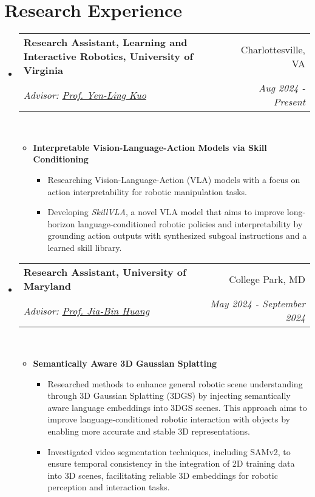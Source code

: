 \documentclass[letterpaper,11pt]{article}
\makeatletter
\newcommand{\Date}[1]{\textit{\small #1}}
\newcommand{\resumeSubheading}[4]{
  \item
    \begin{tabular*}{0.9798\textwidth}{l@{\extracolsep{\fill}}r} %
      \textbf{#1} & #2 \\
      \textit{\small#3} & \Date{#4} \\
    \end{tabular*}\
}
\makeatother
\begin{document}
\section{Research Experience}
\begin{itemize}
  \resumeSubheading{Research Assistant, Learning and Interactive Robotics, University of Virginia}{Charlottesville, VA}
  {Advisor: \href{https://yenlingkuo.com/}{Prof. Yen-Ling Kuo}}{Aug 2024 - Present}
  \begin{itemize}
    \item \textbf{Interpretable Vision-Language-Action Models via Skill Conditioning}
          \begin{itemize}
            \item Researching Vision-Language-Action (VLA) models with a focus on action interpretability for robotic manipulation tasks.
            \item Developing \textit{SkillVLA}, a novel VLA model that aims to improve long-horizon language-conditioned
                  robotic policies and interpretability by grounding action outputs with synthesized subgoal instructions and a learned skill library.
          \end{itemize}
  \end{itemize}

  \resumeSubheading{Research Assistant, University of Maryland}{College Park, MD}
  {Advisor: \href{https://jbhuang0604.github.io/}{Prof. Jia-Bin Huang}}{May 2024 - September 2024}
  \begin{itemize}
    \item \textbf{Semantically Aware 3D Gaussian Splatting}
          \begin{itemize}
            \item Researched methods to enhance general robotic scene understanding through 3D Gaussian Splatting (3DGS) by injecting semantically aware language embeddings into 3DGS scenes. This approach aims to improve language-conditioned robotic interaction with objects by enabling more accurate and stable 3D representations.
            \item Investigated video segmentation techniques, including SAMv2, to ensure temporal consistency in the integration of 2D training data into 3D scenes, facilitating reliable 3D embeddings for robotic perception and interaction tasks.
          \end{itemize}
  \end{itemize}


\end{itemize}
\end{document}
